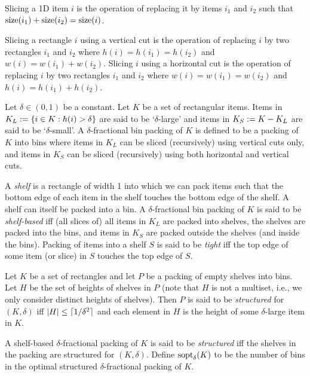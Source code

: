 \begin{definition}[Slicing]
Slicing a 1D item $i$ is the operation of replacing it by items $i_1$ and $i_2$
such that $\operatorname{size}(i_1) + \operatorname{size}(i_2) = \operatorname{size}(i)$.

Slicing a rectangle $i$ using a vertical cut is the operation of replacing $i$
by two rectangles $i_1$ and $i_2$ where
$h(i) = h(i_1) = h(i_2)$ and $w(i) = w(i_1) + w(i_2)$.
Slicing $i$ using a horizontal cut is the operation of replacing $i$
by two rectangles $i_1$ and $i_2$ where
$w(i) = w(i_1) = w(i_2)$ and $h(i) = h(i_1) + h(i_2)$.
\end{definition}

\begin{definition}
\label{defn:hgap:shelf-based-packing}
Let $\delta \in (0, 1)$ be a constant. Let $K$ be a set of rectangular items.
Items in $K_L := \{i \in K: h(i) > \delta\}$ are said to be `$\delta$-large'
and items in $K_S := K - K_L$ are said to be `$\delta$-small'.
A $\delta$-fractional bin packing of $K$ is defined to be a packing of $K$ into bins where
items in $K_L$ can be sliced (recursively) using vertical cuts only,
and items in $K_S$ can be sliced (recursively) using both horizontal and vertical cuts.

A \emph{shelf} is a rectangle of width 1 into which we can pack items
such that the bottom edge of each item in the shelf touches
the bottom edge of the shelf. A shelf can itself be packed into a bin.
A $\delta$-fractional bin packing of $K$ is said to be \emph{shelf-based} iff
(all slices of) all items in $K_L$ are packed into shelves,
the shelves are packed into the bins,
and items in $K_S$ are packed outside the shelves (and inside the bins).
Packing of items into a shelf $S$ is said to be \emph{tight} iff
the top edge of some item (or slice) in $S$ touches the top edge of $S$.
\end{definition}

\begin{definition}
Let $K$ be a set of rectangles and
let $P$ be a packing of empty shelves into bins.
Let $H$ be the set of heights of shelves in $P$ (note that $H$ is not a multiset,
i.e., we only consider distinct heights of shelves).
Then $P$ is said to be \emph{structured} for $(K, \delta)$ iff
$|H| \le \lceil 1/\delta^2 \rceil$ and each element in $H$ is
the height of some $\delta$-large item in $K$.

A shelf-based $\delta$-fractional packing of $K$ is said to be
\emph{structured} iff the shelves in the packing are structured for $(K, \delta)$.
Define $\operatorname{sopt}_{\delta}(K)$ to be the number of bins in the optimal structured
$\delta$-fractional packing of $K$.
\end{definition}

